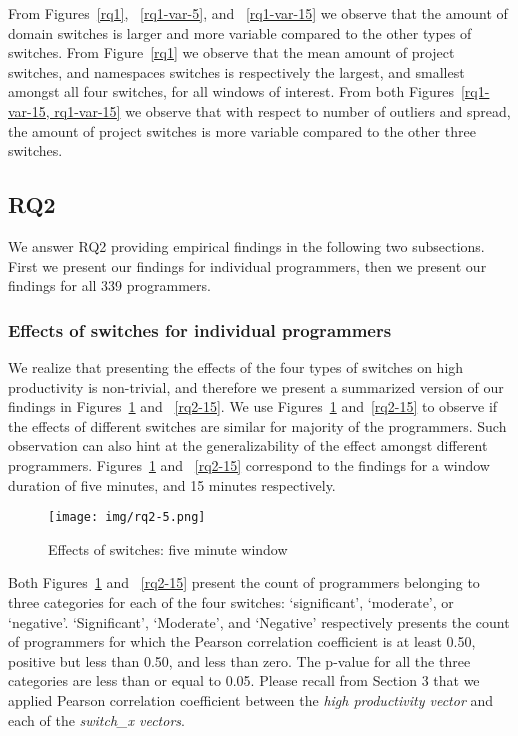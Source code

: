 From Figures~\ref{rq1}, ~\ref{rq1-var-5}, and ~\ref{rq1-var-15} we
observe that the amount of domain switches is larger and more variable compared to the other types of switches. From Figure~\ref{rq1} we observe that the mean amount of project switches, and namespaces switches is respectively the largest, and smallest amongst all four switches, for all windows of interest. From both Figures~\ref{rq1-var-15, rq1-var-15} we observe that with respect to number of outliers and spread, the amount of project switches is more variable compared to the other three switches. 



\subsection{RQ2}

We answer RQ2 providing empirical findings 
in the following two subsections. First we present our findings for individual programmers, then we present our findings for all 339 programmers. 
\subsubsection{Effects of switches for individual programmers}
We realize that presenting the effects of the four types of switches on high productivity is non-trivial, and therefore we present a summarized version of our findings in Figures~\ref{rq2-5} and ~\ref{rq2-15}. We use Figures~\ref{rq2-5} and~\ref{rq2-15} to observe if the effects of different switches are similar for majority of the programmers. Such observation can also hint at the generalizability of the effect amongst different programmers. Figures~\ref{rq2-5} and ~\ref{rq2-15} correspond to 
the findings for a window duration of five minutes, and 15 minutes respectively. 

\begin{figure}[htbp]
\centering
\texttt{[image: img/rq2-5.png]}
\caption{Effects of switches: five minute window}
\label{rq2-5}
\end{figure}

Both Figures~\ref{rq2-5} and ~\ref{rq2-15} present the count of programmers belonging to three categories for each of the four switches: `significant', `moderate', or `negative'. `Significant', `Moderate', and `Negative' respectively presents the count of programmers for which the Pearson correlation coefficient is  at least 0.50, positive but less than 0.50, and less than zero. The p-value for all the three categories are less than or equal to 0.05. Please recall from Section 3 that we applied Pearson correlation coefficient between the \textit{high productivity vector} and each of the \textit{switch\_x vectors}.  

